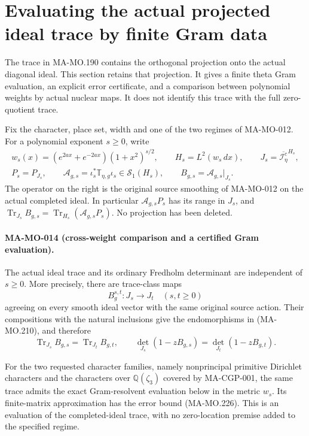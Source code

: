 \section{Evaluating the actual projected ideal trace by finite Gram data}
\label{sec:projected-ideal-gram}

The trace in MA-MO.190 contains the orthogonal projection onto the
actual diagonal ideal.  This section retains that projection.  It
gives a finite theta Gram evaluation, an explicit error certificate,
and a comparison between polynomial weights by actual nuclear maps.
It does not identify this trace with the full zero-quotient trace.

Fix the character, place set, width and one of the two regimes of
MA-MO-012.  For a polynomial exponent \(s\ge0\), write
\[
 \begin{gathered}
 w_s(x)=(e^{2ax}+e^{-2ax})(1+x^2)^{s/2},\qquad
 H_s=L^2(w_s\,dx),\qquad J_s=\overline{\mathscr I^c_\eta}^{H_s},\\
 P_s=P_{J_s},\qquad
 \mathcal A_{g,s}=\iota_s^*\mathbb T_{\eta,g}\iota_s
       \in\mathcal S_1(H_s),\qquad
 B_{g,s}=\mathcal A_{g,s}|_{J_s}.
 \end{gathered}
 \tag{MA-MO.210}
\]
The operator on the right is the original source smoothing of
MA-MO-012 on the actual completed ideal.  In particular
\(\mathcal A_{g,s}P_s\) has its range in \(J_s\), and
\(\operatorname{Tr}_{J_s}B_{g,s}=\operatorname{Tr}_{H_s}
(\mathcal A_{g,s}P_s)\).  No projection has been deleted.

\paragraph{MA-MO-014 (cross-weight comparison and a certified Gram evaluation).}
The actual ideal trace and its ordinary Fredholm determinant are
independent of \(s\ge0\).  More precisely, there are trace-class maps
\[
 B_g^{s,t}:J_s\longrightarrow J_t\quad(s,t\ge0)
 \tag{MA-MO.211}
\]
agreeing on every smooth ideal vector with the same original source
action.  Their compositions with the natural inclusions give the
endomorphisms in (MA-MO.210), and therefore
\[
 \operatorname{Tr}_{J_s}B_{g,s}=\operatorname{Tr}_{J_t}B_{g,t},
 \qquad
 \det_{J_s}(1-zB_{g,s})=\det_{J_t}(1-zB_{g,t}).
 \tag{MA-MO.212}
\]

For the two requested character families, namely nonprincipal
primitive Dirichlet characters and the characters over
\(\mathbb Q(\zeta_3)\) covered by MA-CGP-001, the same trace admits
the exact Gram-resolvent evaluation below in the metric \(w_s\).
Its finite-matrix approximation has the error bound
(MA-MO.226).  This is an evaluation of the completed-ideal trace,
with no zero-location premise added to the specified regime.

